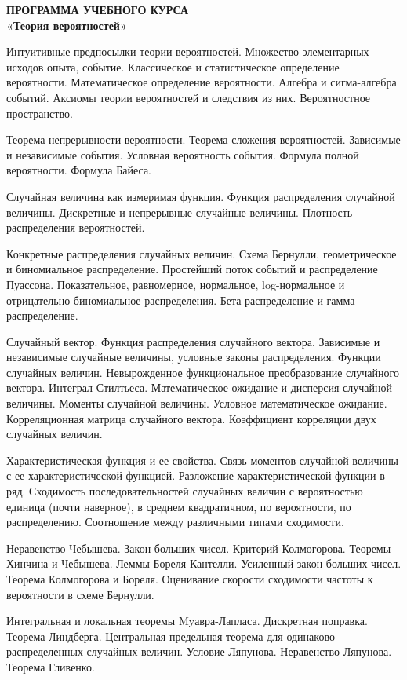 \begin{center}

\textbf{ПРОГРАММА УЧЕБНОГО КУРСА  \\ 
«Теория вероятностей»  \\}
 

\end{center}
 
 {\small
 
Интуитивные предпосылки теории вероятностей. Множество элементарных исходов опыта, событие. Классическое и статистическое определение вероятности. Математическое определение вероятности. Алгебра и сигма-алгебра событий. Аксиомы теории вероятностей и следствия из них. Вероятностное пространство.

Теорема непрерывности вероятности. Теорема сложения вероятностей. Зависимые и независимые события. Условная вероятность события. Формула полной вероятности. Формула Байеса.

Случайная величина как измеримая функция. Функция распределения случайной величины. Дискретные и непрерывные случайные величины. Плотность распределения вероятностей.

Конкретные распределения случайных величин. Схема Бернулли, геометрическое и биномиальное распределение. Простейший поток событий и распределение Пуассона. Показательное, равномерное, нормальное, log-нормальное и отрицательно-биномиальное распределения. Бета-распределение и гамма-распределение.

Случайный вектор. Функция распределения случайного вектора. Зависимые и независимые случайные величины, условные законы распределения. Функции случайных величин. Невырожденное функциональное преобразование случайного вектора.
Интеграл Стилтьеса. Математическое ожидание и дисперсия случайной величины. Моменты случайной величины. Условное математическое ожидание. Корреляционная матрица случайного вектора. Коэффициент корреляции двух случайных величин.

Характеристическая функция и ее свойства. Связь моментов случайной величины с ее характеристической функцией. Разложение характеристической функции в ряд.
Сходимость последовательностей случайных величин с вероятностью единица (почти наверное), в среднем квадратичном, по вероятности, по распределению. Соотношение между различными типами сходимости.

Неравенство Чебышева. Закон больших чисел. Критерий Колмогорова. Теоремы Хинчина и Чебышева. Леммы Бореля-Кантелли. Усиленный закон больших чисел. Теорема Колмогорова и Бореля. Оценивание скорости сходимости частоты к вероятности в схеме Бернулли.

Интегральная и локальная теоремы Myавра-Лапласа. Дискретная поправка. Теорема Линдберга. Центральная предельная теорема для одинаково распределенных случайных величин. Условие Ляпунова. Неравенство Ляпунова. Теорема Гливенко.
}